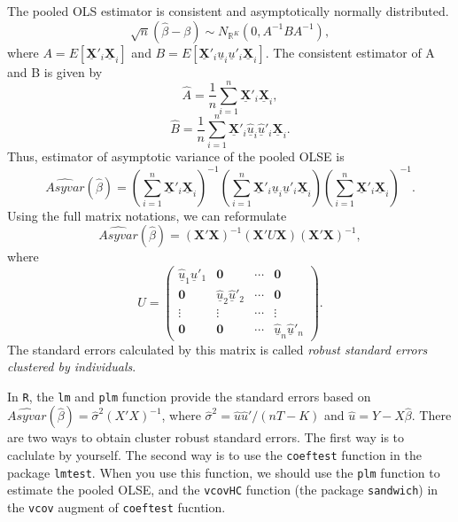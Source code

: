 \documentclass[
  12pt,
]{article}
\begin{document}
The pooled OLS estimator is consistent and asymptotically normally
distributed. \[
  \sqrt{n}(\hat{\beta} - \beta) \sim N_{\mathbb{R}^K}(0, A^{-1} B A^{-1}),
\] where \(A = E[\underline{\mathbf{X}}'_i\underline{\mathbf{X}}_i]\)
and
\(B = E[\underline{\mathbf{X}}'_i \underline{u}_i \underline{u}'_i \underline{\mathbf{X}}_i]\).
The consistent estimator of A and B is given by \[
  \hat{A} = \frac{1}{n} \sum_{i=1}^n \underline{\mathbf{X}}'_i\underline{\mathbf{X}}_i,
\] \[
  \hat{B} = \frac{1}{n} \sum_{i=1}^n \underline{\mathbf{X}}'_i \underline{\hat{u}}_i \underline{\hat{u}}'_i \underline{\mathbf{X}}_i.
\] Thus, estimator of asymptotic variance of the pooled OLSE is \[
  \widehat{Asyvar}(\hat{\beta}) =
  \left( \sum_{i=1}^n \underline{\mathbf{X}}'_i\underline{\mathbf{X}}_i \right)^{-1}
  \left( \sum_{i=1}^n \underline{\mathbf{X}}'_i \underline{u}_i \underline{u}'_i \underline{\mathbf{X}}_i \right)
  \left( \sum_{i=1}^n \underline{\mathbf{X}}'_i\underline{\mathbf{X}}_i \right)^{-1}.
\] Using the full matrix notations, we can reformulate \[
  \widehat{Asyvar}(\hat{\beta}) =
  (\mathbf{X}' \mathbf{X})^{-1}
  (\mathbf{X}' U \mathbf{X})
  (\mathbf{X}' \mathbf{X})^{-1},
\] where \[
  U = 
  \begin{pmatrix}
    \underline{\hat{u}}_1 \underline{\hat{u}}'_1 & \mathbf{0} & \cdots & \mathbf{0} \\
    \mathbf{0} & \underline{\hat{u}}_2 \underline{\hat{u}}'_2 & \cdots & \mathbf{0} \\
    \vdots & \vdots & \cdots & \vdots \\
    \mathbf{0} & \mathbf{0} & \cdots & \underline{\hat{u}}_n \underline{\hat{u}}'_n
  \end{pmatrix}.
\] The standard errors calculated by this matrix is called \emph{robust
standard errors clustered by individuals}.

In \texttt{R}, the \texttt{lm} and \texttt{plm} function provide the
standard errors based on
\(\widehat{Asyvar}(\hat{\beta}) = \hat{\sigma}^2 (X'X)^{-1}\), where
\(\hat{\sigma}^2 = \hat{u}\hat{u}'/(nT - K)\) and
\(\hat{u} = Y - X \hat{\beta}\). There are two ways to obtain cluster
robust standard errors. The first way is to caclulate by yourself. The
second way is to use the \texttt{coeftest} function in the package
\texttt{lmtest}. When you use this function, we should use the
\texttt{plm} function to estimate the pooled OLSE, and the
\texttt{vcovHC} function (the package \texttt{sandwich}) in the
\texttt{vcov} augment of \texttt{coeftest} fucntion.
\end{document}
